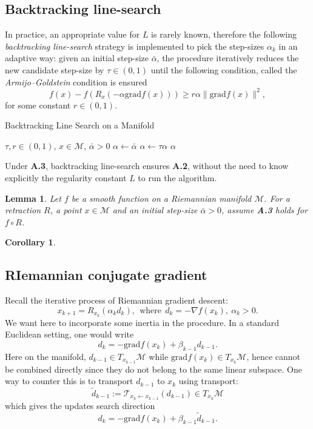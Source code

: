 \documentclass[10pt,a4paper]{book}
\theoremstyle{definition}
\theoremstyle{plain}
\newtheorem{cor}{Corollary}[section]
\newtheorem{lma}{Lemma}[section]
\theoremstyle{remark}
\newcommand{\grad}{\textrm{grad}}
\newcommand \M {\mathcal{M}}
\begin{document}
\subsection{Backtracking line-search}
In practice, an appropriate value for $L$ is rarely known, therefore the following \emph{backtracking line-search} strategy is implemented to pick the step-sizes $\alpha_k$ in an adaptive way: given an initial step-size $\bar{\alpha}$, the procedure iteratively reduces the new candidate step-size by $\tau \in (0,1)$ until the following condition, called the \emph{Armijo--Goldstein} condition is ensured
$$f(x)-f(R_x(-\alpha \grad f(x)))\ge r\alpha \|\grad f(x)\|^2,$$
for some constant $r\in (0,1)$. 

\begin{algorithm}
\caption{Backtracking Line Search on a Manifold}
\begin{algorithmic}[1]
\Require $\tau, r \in (0,1)$, $x \in \mathcal{M}$, $\bar{\alpha} > 0$
\State $\alpha \leftarrow \bar{\alpha}$
    \State $\alpha \leftarrow \tau \alpha$
\EndWhile
\State \Return $\alpha$
\end{algorithmic}
\end{algorithm}
Under \textbf{A.3}, backtracking line-search ensures \textbf{A.2}, without the need to know explicitly the regularity constant $L$ to run the algorithm.

\begin{lma}
Let $f$ be a smooth function on a Riemannian manifold $\M$. For a retraction $R$, a point $x\in \M$ and an initial step-size $\bar{\alpha}>0$, assume \textbf{A.3} holds for $f\circ R$.
\end{lma}

\begin{cor}

\end{cor}
\subsection{RIemannian conjugate gradient}

Recall the iterative process of Riemannian gradient descent:
$$x_{k+1}=R_{x_k}(\alpha_kd_k),~~\text{where}~~d_k=-\nabla f(x_k),~\alpha_k>0.$$
We want here to incorporate some inertia in the procedure. In a standard Euclidean setting, one would write
$$d_k=-\grad f(x_k)+\beta_{k-1}d_{k-1}.$$
Here on the manifold, $d_{k-1}\in T_{x_{k-1}}\M$ while $\grad f(x_k)\in T_{x_k}\M$, hence cannot be combined directly since they do not belong to the same linear subspace. One way to counter this is to transport $d_{k-1}$ to $x_k$ using transport:
$$\tilde{d}_{k-1}:=\mathcal{T}_{x_k\leftarrow x_{k-1}}(d_{k-1}) \in T_{x_k}\M$$
which gives the updates search direction
$$d_{k}=-\grad f(x_k)+\beta_{k-1}\tilde{d}_{k-1}.$$
\end{document}
